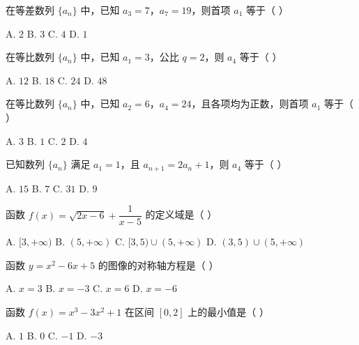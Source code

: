 \documentclass[11pt, a4paper]{article}
\begin{document}
\begin{baitap}[22]
在等差数列 $\{a_n\}$ 中，已知 $a_3 = 7$，$a_7 = 19$，则首项 $a_1$ 等于（ ）
\par\vspace{3pt}
\noindent A. $2$ \quad B. $3$ \quad C. $4$ \quad D. $1$
\end{baitap}

\begin{baitap}[23]
在等比数列 $\{a_n\}$ 中，已知 $a_1 = 3$，公比 $q = 2$，则 $a_4$ 等于（ ）
\par\vspace{3pt}
\noindent A. $12$ \quad B. $18$ \quad C. $24$ \quad D. $48$
\end{baitap}

\begin{baitap}[24]
在等比数列 $\{a_n\}$ 中，已知 $a_2 = 6$，$a_4 = 24$，且各项均为正数，则首项 $a_1$ 等于（ ）
\par\vspace{3pt}
\noindent A. $3$ \quad B. $1$ \quad C. $2$ \quad D. $4$
\end{baitap}

\begin{baitap}[25]
已知数列 $\{a_n\}$ 满足 $a_1 = 1$，且 $a_{n+1} = 2a_n + 1$，则 $a_4$ 等于（ ）
\par\vspace{3pt}
\noindent A. $15$ \quad B. $7$ \quad C. $31$ \quad D. $9$
\end{baitap}

\begin{baitap}[26]
函数 $f(x) = \sqrt{2x - 6} + \dfrac{1}{x - 5}$ 的定义域是（ ）
\par\vspace{3pt}
\noindent A. $[3, +\infty)$ \quad B. $(5, +\infty)$ \quad C. $[3, 5) \cup (5, +\infty)$ \quad D. $(3, 5) \cup (5, +\infty)$
\end{baitap}

\begin{baitap}[27]
函数 $y = x^2 - 6x + 5$ 的图像的对称轴方程是（ ）
\par\vspace{3pt}
\noindent A. $x = 3$ \quad B. $x = -3$ \quad C. $x = 6$ \quad D. $x = -6$
\end{baitap}

\begin{baitap}[28]
函数 $f(x) = x^3 - 3x^2 + 1$ 在区间 $[0, 2]$ 上的最小值是（ ）
\par\vspace{3pt}
\noindent A. $1$ \quad B. $0$ \quad C. $-1$ \quad D. $-3$
\end{baitap}
\end{document}
